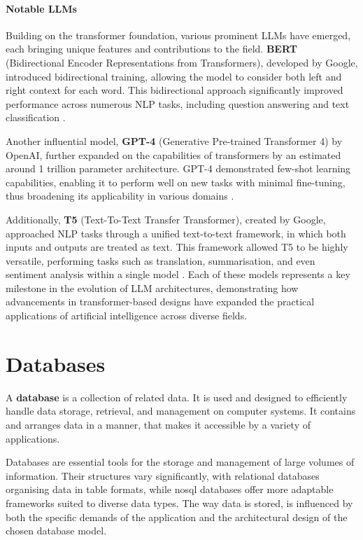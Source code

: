 \paragraph{Notable LLMs} Building on the transformer foundation, various prominent LLMs have emerged, each bringing unique features and contributions to the field. \textbf{BERT} (Bidirectional Encoder Representations from Transformers), developed by Google, introduced bidirectional training, allowing the model to consider both left and right context for each word. This bidirectional approach significantly improved performance across numerous NLP tasks, including question answering and text classification \citep{devlin2019bert}. 

Another influential model, \textbf{GPT-4} (Generative Pre-trained Transformer 4) by OpenAI, further expanded on the capabilities of transformers by an estimated around 1 trillion parameter architecture. GPT-4 demonstrated few-shot learning capabilities, enabling it to perform well on new tasks with minimal fine-tuning, thus broadening its applicability in various domains \citep{brown2020gpt3}. 

Additionally, \textbf{T5} (Text-To-Text Transfer Transformer), created by Google, approached NLP tasks through a unified text-to-text framework, in which both inputs and outputs are treated as text. This framework allowed T5 to be highly versatile, performing tasks such as translation, summarisation, and even sentiment analysis within a single model \citep{raffel2020t5}. Each of these models represents a key milestone in the evolution of LLM architectures, demonstrating how advancements in transformer-based designs have expanded the practical applications of artificial intelligence across diverse fields.

\section{Databases}\label{sec:databases}
\begin{definition}\label{def:database}
    A \textbf{database} is a collection of related data\citep{limited2010introduction}. 
    It is used and designed to efficiently handle data storage, retrieval, and management on computer systems. 
    It contains and arranges data in a manner, that makes it accessible by a variety of applications.
\end{definition}
Databases are essential tools for the storage and management of large volumes of information. 
Their structures vary significantly, with relational databases organising data in table formats, while \ac{nosql} databases offer more adaptable frameworks suited to diverse data types. 
The way data is stored, is influenced by both the specific demands of the application and the architectural design of the chosen database model.
